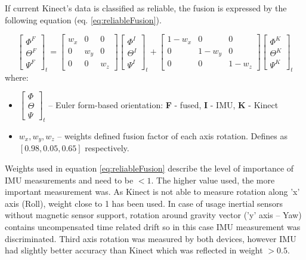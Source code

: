 \documentclass[9pt]{llncs}
\begin{document}
If current Kinect's data is classified as reliable, the fusion is expressed by the following equation (eq. \ref{eq:reliableFusion}).

\begin{equation}
	\label{eq:reliableFusion}
	\begin{bmatrix}  \Phi^F \\  \Theta^F \\  \Psi^F \end{bmatrix}_t = 
	\begin{bmatrix}  w_x&0&0 \\  0&w_y&0 \\  0&0&w_z \end{bmatrix}
	\begin{bmatrix}  \Phi^I \\  \Theta^I \\  \Psi^I \end{bmatrix}_t + 
	\begin{bmatrix}  1-w_x&0&0 \\  0&1-w_y&0 \\  0&0&1-w_z \end{bmatrix}
	\begin{bmatrix}  \Phi^K \\  \Theta^K \\  \Psi^K \end{bmatrix}_t
\end{equation}
where:
\begin{itemize}
	\item $ \begin{bmatrix}  \Phi \\  \Theta \\  \Psi \end{bmatrix}_t$ -- Euler form-based orientation: \textbf{F} - fused, \textbf{I} - IMU, \textbf{K} - Kinect
	\item $w_x,w_y,w_z$ -- weights defined fusion factor of each axis rotation. Defines as $[0.98, 0.05, 0.65]$ respectively.
\end{itemize}

Weights used in equation \ref{eq:reliableFusion} describe the level of importance of IMU measurements and need to be $ < 1$. The higher value used, the more important measurement was. As Kinect is not able to measure rotation along 'x' axis (Roll), weight close to 1 has been used. In case of usage inertial sensors without magnetic sensor support, rotation around gravity vector ('y' axis -- Yaw) contains uncompensated time related drift so in this case IMU measurement was discriminated. Third axis rotation was measured by both devices, however IMU had slightly better accuracy than Kinect which was reflected in weight $ > 0.5$.
\end{document}
